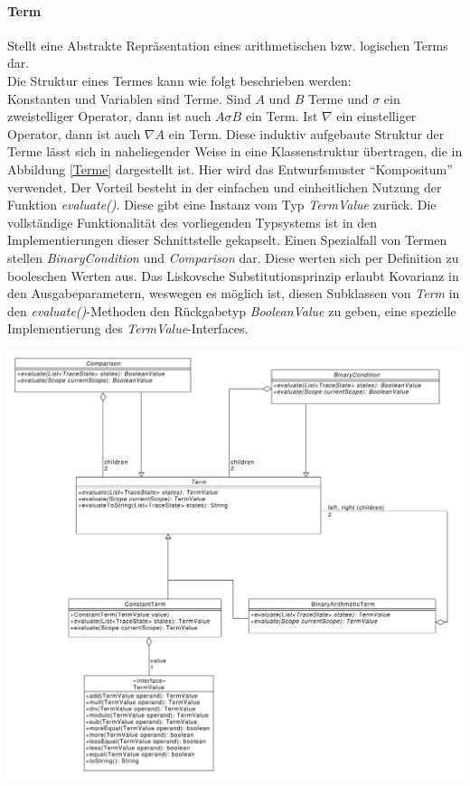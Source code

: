 \documentclass[parskip=full]{scrartcl}
\begin{document}
\paragraph{Term}
Stellt eine Abstrakte Repräsentation eines arithmetischen bzw. logischen Terms dar. 
\\
Die Struktur eines Termes kann wie folgt beschrieben werden: \\
Konstanten und Variablen sind Terme. Sind $A$ und $B$ Terme und $\sigma$ ein zweistelliger Operator, dann ist auch $A\sigma B$ ein Term. Ist $\nabla$ ein einstelliger Operator, dann ist auch $\nabla A$ ein Term. Diese induktiv aufgebaute Struktur der Terme lässt sich in naheliegender Weise in eine Klassenstruktur übertragen, die in Abbildung \ref{Terme} dargestellt ist. Hier wird das Entwurfsmuster \enquote{Kompositum} verwendet. Der Vorteil besteht in der einfachen und einheitlichen Nutzung der Funktion \textit{evaluate()}. Diese gibt eine Instanz vom Typ \textit{TermValue} zurück. Die vollständige Funktionalität des vorliegenden Typsystems ist in den Implementierungen dieser Schnittstelle gekapselt. Einen Spezialfall von Termen stellen \textit{BinaryCondition} und \textit{Comparison} dar. Diese werten sich per Definition zu booleschen Werten aus. Das Liskovsche Substitutionsprinzip erlaubt Kovarianz in den Ausgabeparametern, weswegen es möglich ist, diesen Subklassen von \textit{Term} in den \textit{evaluate()}-Methoden den Rückgabetyp \textit{BooleanValue} zu geben, eine spezielle Implementierung des \textit{TermValue}-Interfaces.
\begin{center}
\includegraphics[width=1.0\textwidth]{diagrammIdeenUmlet/TermCondition.pdf}
\label{Terme}
\end{center}
\end{document}
